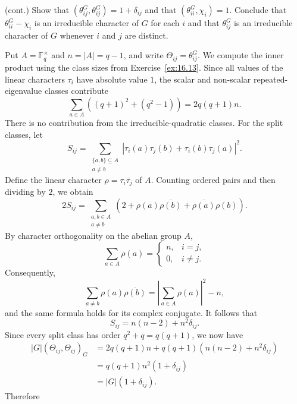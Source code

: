 \documentclass[../Odyssey_Project.tex]{subfiles}
\begin{document}
\begin{exercise}
\label{ex:16.15}
(cont.) Show that $(\theta_{ij}^G, \theta_{ij}^G) = 1 + \delta_{ij}$ and that $(\theta_{ii}^G, \chi_i) = 1$. Conclude that $\theta_{ii}^G - \chi_i$ is an irreducible character of $G$ for each $i$ and that $\theta_{ij}^G$ is an irreducible character of $G$ whenever $i$ and $j$ are distinct.
\end{exercise}
\begin{solution}
    Put $A=\mathbb{F}_q^\times$ and $n=|A|=q-1$, and write $\Theta_{ij}=\theta_{ij}^G$. We compute the inner product using the class sizes from Exercise~\ref{ex:16.13}. Since all values of the linear characters $\tau_i$ have absolute value $1$, the scalar and non-scalar repeated-eigenvalue classes contribute
    \[
        \sum_{a\in A}\left((q+1)^2+(q^2-1)\right)
        =
        2q(q+1)n.
    \]
    There is no contribution from the irreducible-quadratic classes. For the split classes, let
    \[
        S_{ij}
        =
        \sum_{\substack{\{a,b\}\subseteq A\\a\neq b}}
        \left|
        \tau_i(a)\tau_j(b)+\tau_i(b)\tau_j(a)
        \right|^2.
    \]
    Define the linear character $\rho=\tau_i\overline{\tau_j}$ of $A$. Counting ordered pairs and then dividing by $2$, we obtain
    \[
        2S_{ij}
        =
        \sum_{\substack{a,b\in A\\a\neq b}}
        \left(
        2+\rho(a)\overline{\rho(b)}
        +\overline{\rho(a)}\rho(b)
        \right).
    \]
    By character orthogonality on the abelian group $A$,
    \[
        \sum_{a\in A}\rho(a)
        =
        \begin{cases}
            n,&i=j,\\
            0,&i\neq j.
        \end{cases}
    \]
    Consequently,
    \[
        \sum_{a\neq b}\rho(a)\overline{\rho(b)}
        =
        \left|\sum_{a\in A}\rho(a)\right|^2-n,
    \]
    and the same formula holds for its complex conjugate. It follows that
    \[
        S_{ij}=n(n-2)+n^2\delta_{ij}.
    \]
    Since every split class has order $q^2+q=q(q+1)$, we now have
    \begin{align*}
        |G|(\Theta_{ij},\Theta_{ij})_G
        &=
        2q(q+1)n
        +q(q+1)\left(n(n-2)+n^2\delta_{ij}\right) \\
        &=
        q(q+1)n^2(1+\delta_{ij}) \\
        &=
        |G|(1+\delta_{ij}).
    \end{align*}
    Therefore

\end{solution}
\end{document}
